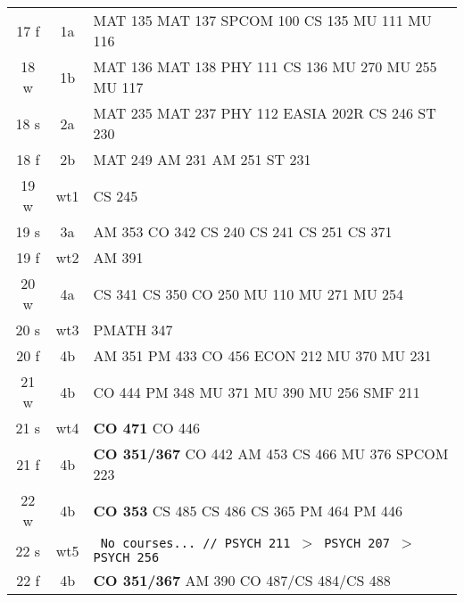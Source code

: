 \documentclass[convert]{standalone}
\begin{document}
\begin{tabular}{|c | c | l |}
	\hline
	17 f & 1a & MAT 135 \quad MAT 137 \quad SPCOM 100 \quad CS 135 \quad MU 111 \quad MU 116 \\
	18 w & 1b & MAT 136 \quad MAT 138 \quad PHY 111 \quad CS 136 \quad MU 270 \quad MU 255 \quad MU 117 \\
	18 s & 2a & MAT 235 \quad MAT 237 \quad PHY 112 \quad EASIA 202R \quad CS 246 \quad ST  230 \\
	18 f & 2b & MAT 249 \quad AM 231 \quad AM 251 \quad ST  231 \\
	19 w & wt1 & CS 245 \\
	19 s & 3a & AM 353 \quad CO 342 \quad CS 240 \quad CS 241 \quad CS 251 \quad CS 371 \\
	19 f & wt2 & AM 391 \\
	20 w & 4a & CS 341 \quad CS 350 \quad CO 250  \quad MU 110 \quad MU 271 \quad MU 254 \\
	20 s & wt3 & PMATH 347 \\
	20 f & 4b & AM 351  \quad PM 433  \quad CO 456 \quad ECON 212  \quad MU 370 \quad MU 231   \\
	21 w & 4b & CO 444 \quad PM 348   \quad MU 371   \quad MU 390 \quad MU 256 \quad SMF 211 \\
	21 s & wt4 & {\color{red}\textbf{CO 471}} \quad CO 446 \quad   \\
	21 f & 4b &{\color{white} \textbf{CO 351/367}} \quad CO 442  \quad AM 453 \quad CS 466 \quad MU 376 \quad SPCOM 223      \\
	22 w & 4b & {\color{red} \textbf{CO 353}}  \quad CS 485 \quad CS 486 \quad CS 365 \quad PM 464 \quad PM 446     \\
	22 s & wt5 & {\tt  \color{gray} No courses... // PSYCH 211 $>$ PSYCH 207 $>$ PSYCH 256} \\
	22 f & 4b & {\color{red} \textbf{CO 351/367}} \quad  AM 390 \quad  CO 487/CS 484/CS 488   \\\hline

\end{tabular}
\end{document}
